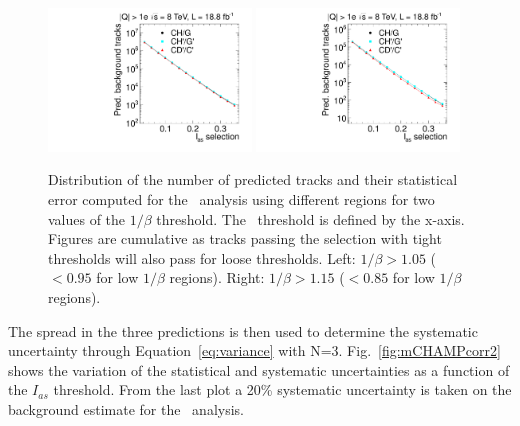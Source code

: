 \begin{figure}%
 \begin{center}
 \includegraphics[clip=false, trim=0.0cm 0cm 0.0cm 0cm, width=0.48\textwidth]{figures/multi/Data8TeVCollisionPrediction_TOF105}
 \includegraphics[clip=false, trim=0.0cm 0cm 0.0cm 0cm, width=0.48\textwidth]{figures/multi/Data8TeVCollisionPrediction_TOF115}
 \end{center}
 \caption[Distribution of the number of predicted tracks from different predictions in the \multi\ analysis]
{Distribution of the number of predicted tracks and their
   statistical error computed for the \multi\ analysis using
   different regions for two values of the $1/\beta$ threshold. The \ias\ threshold is defined by the x-axis.
Figures are cumulative as tracks passing the selection with tight thresholds will also pass for loose thresholds.
Left: $1/\beta>1.05$ ($<0.95$ for low $1/\beta$ regions). Right: $1/\beta>1.15$ ($<0.85$ for low $1/\beta$ regions).}
 \label{fig:mCHAMPcorr}
\end{figure}

The spread in the three predictions is then used to determine the systematic uncertainty through Equation~\ref{eq:variance} with N=3.
Fig.~\ref{fig:mCHAMPcorr2} shows the variation of the statistical and systematic uncertainties as a function of the $I_{as}$ threshold.
From the last plot a 20\% systematic uncertainty is taken on the background estimate for the \multi\ analysis.

